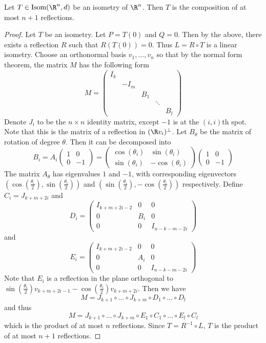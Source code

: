 \documentclass[a4paper]{article}
\begin{document}
\begin{thm}{}{} Let $T\in\text{Isom}(\R^n,d)$ be an isometry of $\R^n$. Then $T$ is the composition of at most $n+1$ reflections. 
\begin{proof} Let $T$ be an isometry. Let $P=T(0)$ and $Q=0$. Then by the above, there exists a reflection $R$ such that $R(T(0))=0$. Thus $L=R\circ T$ is a linear isometry. Choose an orthonormal basis $v_1,\dots,v_n$ so that by the normal form theorem, the matrix $M$ has the following form $$M=\begin{pmatrix}
I_k &&&&\\
&-I_m&&&\\
&&B_1&&\\
&&&\ddots&\\
&&&&B_l
\end{pmatrix}$$
Denote $J_i$ to be the $n\times n$ identity matrix, except $-1$ is at the $(i,i)$th spot. Note that this is the matrix of a reflection in $(\R v_i)^\perp$. Let $B_\theta$ be the matrix of rotation of degree $\theta$. Then it can be decomposed into $$B_i=A_i\begin{pmatrix}
1 & 0\\
0 & -1
\end{pmatrix}=\begin{pmatrix}
\cos(\theta_i) & \sin(\theta_i)\\
\sin(\theta_i) & -\cos(\theta_i)
\end{pmatrix}\begin{pmatrix}
1 & 0\\
0 & -1
\end{pmatrix}$$
The matrix $A_\theta$ has eigenvalues $1$ and $-1$, with corresponding eigenvectors $\left(\cos\left(\frac{\theta_i}{2}\right),\sin\left(\frac{\theta_i}{2}\right)\right)$ and $\left(\sin\left(\frac{\theta_i}{2}\right),-\cos\left(\frac{\theta_i}{2}\right)\right)$ respectively. \linebreak\linebreak
Define $C_i=J_{k+m+2i}$ and $$D_i=\begin{pmatrix}
I_{k+m+2i-2} & 0 & 0\\
0 & B_i & 0\\
0 & 0 & I_{n-k-m-2i}
\end{pmatrix}$$ and $$E_i=\begin{pmatrix}
I_{k+m+2i-2} & 0 & 0\\
0 & A_i & 0\\
0 & 0 & I_{n-k-m-2i}
\end{pmatrix}$$
Note that $E_i$ is a reflection in the plane orthogonal to $\sin\left(\frac{\theta_i}{2}\right)v_{k+m+2i-1}-\cos\left(\frac{\theta_i}{2}\right)v_{k+m+2i}$. Then we have $$M=J_{k+1}\circ\dots\circ J_{k+m}\circ D_1\circ\dots\circ D_l$$ and thus $$M=J_{k+1}\circ\dots\circ J_{k+m}\circ E_1\circ C_1\circ\dots\circ E_l\circ C_l$$ which is the product of at most $n$ reflections. Since $T=R^{-1}\circ L$, $T$ is the product of at most $n+1$ reflections. 
\end{proof}
\end{thm}
\end{document}
